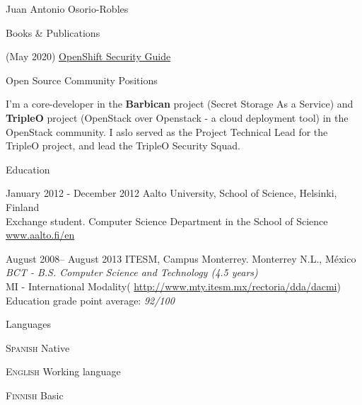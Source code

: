 \documentclass[english,10pt,letterpaper]{article}
\begin{document}
\begin{cv}{Juan Antonio Osorio-Robles}
    \begin{cvlist}{Books \& Publications}
		\item []
            (May 2020) \href{https://www.amazon.com/dp/B087YSL9L2}{OpenShift Security Guide}
	\end{cvlist}

    \begin{cvlist}{Open Source Community Positions}
		\item []
            I'm a core-developer in the \textbf{Barbican} project (Secret
            Storage As a Service) and \textbf{TripleO} project (OpenStack
            over Openstack - a cloud deployment tool) in the OpenStack
            community. I aslo served as the Project Technical Lead for the
            TripleO project, and lead the TripleO Security Squad.
	\end{cvlist}

	\begin{cvlist}{Education}
		\item [January 2012 - December 2012]
			Aalto University, School of Science, Helsinki, Finland\\
			Exchange student. Computer Science Department in the School of
            Science\\
			\href{www.aalto.fi/en}{www.aalto.fi/en}

		\item	[August 2008-- August 2013]
			ITESM, Campus Monterrey. Monterrey N.L., M\'{e}xico\\
			\emph{BCT - B.S. Computer Science and Technology (4.5 years)}\\
			MI - International Modality(
            \url{http://www.mty.itesm.mx/rectoria/dda/dacmi})\\
			Education grade point average: \emph{92/100}
	\end{cvlist}

	\begin{cvlist}{Languages}
		\item [\textsc {Spanish}]
				Native
		\item [\textsc {English}]
				Working language
		\item [\textsc {Finnish}]
				Basic
		\end{cvlist}


\end{cv}
\end{document}
